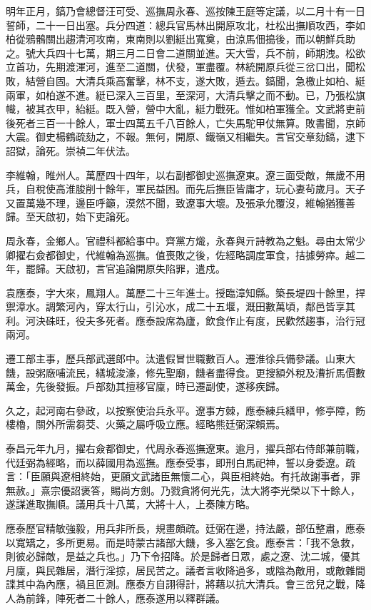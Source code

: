\begin{pinyinscope}
明年正月，鎬乃會總督汪可受、巡撫周永春、巡按陳王庭等定議，以二月十有一日誓師，二十一日出塞。兵分四道：總兵官馬林出開原攻北，杜松出撫順攻西，李如柏從鴉鶻關出趨清河攻南，東南則以劉綎出寬奠，由涼馬佃搗後，而以朝鮮兵助之。號大兵四十七萬，期三月二日會二道關並進。天大雪，兵不前，師期洩。松欲立首功，先期渡渾河，進至二道關，伏發，軍盡覆。林統開原兵從三岔口出，聞松敗，結營自固。大清兵乘高奮擊，林不支，遂大敗，遁去。鎬聞，急檄止如柏、綎兩軍，如柏遂不進。綎已深入三百里，至深河，大清兵擊之而不動。已，乃張松旗幟，被其衣甲，紿綎。既入營，營中大亂，綎力戰死。惟如柏軍獲全。文武將吏前後死者三百一十餘人，軍士四萬五千八百餘人，亡失馬駝甲仗無算。敗書聞，京師大震。御史楊鶴疏劾之，不報。無何，開原、鐵嶺又相繼失。言官交章劾鎬，逮下詔獄，論死。崇禎二年伏法。

李維翰，睢州人。萬歷四十四年，以右副都御史巡撫遼東。遼三面受敵，無歲不用兵，自稅使高淮朘削十餘年，軍民益困。而先后撫臣皆庸才，玩心妻茍歲月。天子又置萬幾不理，邊臣呼籲，漠然不聞，致遼事大壞。及張承允覆沒，維翰猶獲善歸。至天啟初，始下吏論死。

周永春，金鄉人。官禮科都給事中。齊黨方熾，永春與亓詩教為之魁。尋由太常少卿擢右僉都御史，代維翰為巡撫。值喪敗之後，佐經略調度軍食，拮據勞瘁。越二年，罷歸。天啟初，言官追論開原失陷罪，遣戍。

袁應泰，字大來，鳳翔人。萬歷二十三年進士。授臨漳知縣。築長堤四十餘里，捍禦漳水。調繁河內，穿太行山，引沁水，成二十五堰，溉田數萬頃，鄰邑皆享其利。河決硃旺，役夫多死者。應泰設席為廬，飲食作止有度，民歡然趨事，治行冠兩河。

遷工部主事，歷兵部武選郎中。汰遣假冒世職數百人。遷淮徐兵備參議。山東大饑，設粥廠哺流民，繕城浚濠，修先聖廟，饑者盡得食。更搜額外稅及漕折馬價數萬金，先後發振。戶部劾其擅移官廩，時已遷副使，遂移疾歸。

久之，起河南右參政，以按察使治兵永平。遼事方棘，應泰練兵繕甲，修亭障，飭樓櫓，關外所需芻茭、火藥之屬呼吸立應。經略熊廷弼深賴焉。

泰昌元年九月，擢右僉都御史，代周永春巡撫遼東。逾月，擢兵部右侍郎兼前職，代廷弼為經略，而以薛國用為巡撫。應泰受事，即刑白馬祀神，誓以身委遼。疏言：「臣願與遼相終始，更願文武諸臣無懷二心，與臣相終始。有托故謝事者，罪無赦。」熹宗優詔褒答，賜尚方劍。乃戮貪將何光先，汰大將李光榮以下十餘人，遂謀進取撫順。議用兵十八萬，大將十人，上奏陳方略。

應泰歷官精敏強毅，用兵非所長，規畫頗疏。廷弼在邊，持法嚴，部伍整肅，應泰以寬矯之，多所更易。而是時蒙古諸部大饑，多入塞乞食。應泰言：「我不急救，則彼必歸敵，是益之兵也。」乃下令招降。於是歸者日眾，處之遼、沈二城，優其月廩，與民雜居，潛行淫掠，居民苦之。議者言收降過多，或陰為敵用，或敵雜間諜其中為內應，禍且叵測。應泰方自詡得計，將藉以抗大清兵。會三岔兒之戰，降人為前鋒，陣死者二十餘人，應泰遂用以釋群議。


\end{pinyinscope}
